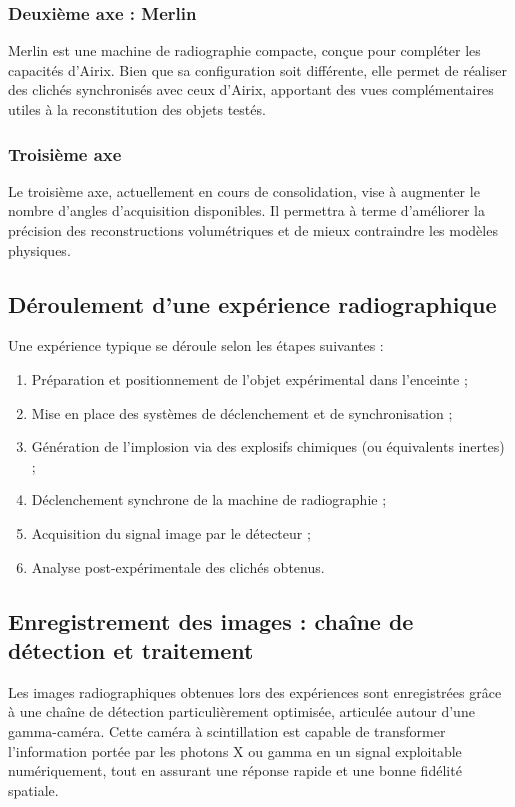 \documentclass[12pt,a4paper]{report}
\begin{document}
\subsubsection{Deuxième axe : Merlin}
Merlin est une machine de radiographie compacte, conçue pour compléter les capacités d’Airix. Bien que sa configuration soit différente, elle permet de réaliser des clichés synchronisés avec ceux d’Airix, apportant des vues complémentaires utiles à la reconstitution des objets testés.

\subsubsection{Troisième axe}
Le troisième axe, actuellement en cours de consolidation, vise à augmenter le nombre d’angles d’acquisition disponibles. Il permettra à terme d’améliorer la précision des reconstructions volumétriques et de mieux contraindre les modèles physiques.

\subsection{Déroulement d'une expérience radiographique}
Une expérience typique se déroule selon les étapes suivantes :
\begin{enumerate}
\item Préparation et positionnement de l’objet expérimental dans l’enceinte ;
\item Mise en place des systèmes de déclenchement et de synchronisation ;
\item Génération de l’implosion via des explosifs chimiques (ou équivalents inertes) ;
\item Déclenchement synchrone de la machine de radiographie ;
\item Acquisition du signal image par le détecteur ;
\item Analyse post-expérimentale des clichés obtenus.
\end{enumerate}

\subsection{Enregistrement des images : chaîne de détection et traitement}

Les images radiographiques obtenues lors des expériences sont enregistrées grâce à une chaîne de détection particulièrement optimisée, articulée autour d'une gamma-caméra. Cette caméra à scintillation est capable de transformer l’information portée par les photons X ou gamma en un signal exploitable numériquement, tout en assurant une réponse rapide et une bonne fidélité spatiale.
\end{document}

